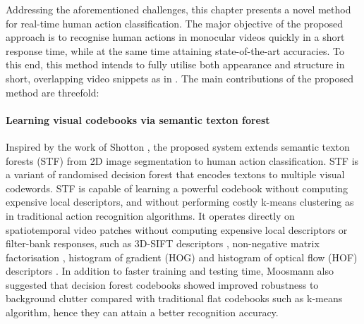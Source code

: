 Addressing the aforementioned challenges, this chapter presents a novel method for real-time human action classification. The major objective of the proposed approach is to recognise human actions in monocular videos quickly in a short response time, while at the same time attaining state-of-the-art accuracies. To this end, this method intends to fully utilise both appearance and structure in short, overlapping video snippets as in \cite{Schindler2008}. The main contributions of the proposed method are threefold:  

\paragraph{Learning visual codebooks via semantic texton forest} 
Inspired by the work of Shotton \etal \cite{Shotton2008}, the proposed system extends semantic texton forests (STF) from 2D image segmentation to human action classification. STF is a variant of randomised decision forest \cite{Ho1995, Amit1997, Breiman2001} that encodes textons to multiple visual codewords. STF is capable of learning a powerful codebook without computing expensive local descriptors, and without performing costly k-means clustering as in traditional action recognition algorithms. It operates directly on spatiotemporal video patches without computing expensive local descriptors or filter-bank responses, such as 3D-SIFT descriptors \cite{Scovanner2007}, non-negative matrix factorisation \cite{Wong2007}, histogram of gradient (HOG) \cite{Schuldt2004, Laptev2008} and histogram of optical flow (HOF) descriptors \cite{Riemenschneider2009}. 
In addition to faster training and testing time, Moosmann \etal \cite{Moosmann2007} also suggested that decision forest codebooks showed improved robustness to background clutter compared with traditional flat codebooks such as k-means algorithm, hence they can attain a better recognition accuracy.  


